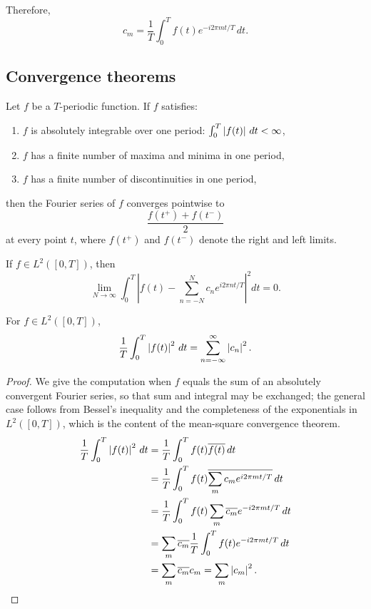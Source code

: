 \begin{notechapter}
Therefore,
\[
c_m = \frac{1}{T} \int_0^T f(t) e^{-i 2\pi m t/T} \, dt.
\]

\subsection{Convergence theorems}

\begin{theorem}
Let $f$ be a $T$-periodic function. If $f$ satisfies:
\begin{enumerate}
\item $f$ is absolutely integrable over one period: $\int_0^T \left|f(t)\right| \, dt < \infty$,
\item $f$ has a finite number of maxima and minima in one period,
\item $f$ has a finite number of discontinuities in one period,
\end{enumerate}
then the Fourier series of $f$ converges pointwise to
\[
\frac{f(t^+) + f(t^-)}{2}
\]
at every point $t$, where $f(t^+)$ and $f(t^-)$ denote the right and left limits.
\end{theorem}

\begin{theorem}
If $f \in L^2([0,T])$, then
\[
\lim_{N \to \infty} \int_0^T \left| f(t) - \sum_{n=-N}^{N} c_n e^{i 2\pi n t/T} \right|^2 dt = 0.
\]
\end{theorem}

\begin{theorem}
For $f \in L^2([0,T])$,
\[
\frac{1}{T} \int_0^T \left|f(t)\right|^2 \, dt = \sum_{n=-\infty}^{\infty} \left|c_n\right|^2.
\]
\end{theorem}

\begin{proof}
We give the computation when $f$ equals the sum of an absolutely convergent Fourier series, so that sum and integral may be exchanged; the general case follows from Bessel's inequality and the completeness of the exponentials in $L^2([0,T])$, which is the content of the mean-square convergence theorem.
\begin{align*}
\frac{1}{T} \int_0^T \left|f(t)\right|^2 \, dt &= \frac{1}{T} \int_0^T f(t) \overline{f(t)} \, dt \\
&= \frac{1}{T} \int_0^T f(t) \overline{\sum_{m} c_m e^{i 2\pi m t/T}} \, dt \\
&= \frac{1}{T} \int_0^T f(t) \sum_{m} \overline{c_m} e^{-i 2\pi m t/T} \, dt \\
&= \sum_{m} \overline{c_m} \frac{1}{T} \int_0^T f(t) e^{-i 2\pi m t/T} \, dt \\
&= \sum_{m} \overline{c_m} c_m = \sum_{m} \left|c_m\right|^2.
\end{align*}
\end{proof}


\end{notechapter}
